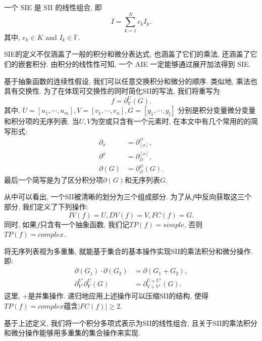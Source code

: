 \begin{definition}
一个 SIE 是 SII 的线性组合, 即
\begin{equation}
I = \sum_{k=1}^N{c_k I_k}.
\label{std_form}
\end{equation} 
其中, $c_k \in K$ and $I_k \in \mathbb F$. 
\end{definition}

SIE的定义不仅涵盖了一般的积分和微分表达式, 也涵盖了它们的乘法, 还涵盖了它们的嵌套积分. 由积分的线性性可知, 一个 AIE 一定能够通过展开加法得到 SIE.

基于抽象函数的连续性假设, 我们可以任意交换积分和微分的顺序. 类似地, 乘法也具有交换性. 为了在体现可交换性的同时简化SII的写法, 我们将重写为
\begin{equation} 
f=\partial^U_V(G). \label{st_form}
\end{equation} 
其中,  $U=[u_1,\cdots,u_m], V=[v_1,\cdots,v_n], G=[g_1,\cdots,g_l]$ 分别是积分变量\D 微分变量和积分项的无序列表. 当$U,V$为空或只含有一个元素时, 在本文中有几个常用的的简写形式:
\begin{equation}
\begin{split}
\partial_x&=\partial^\varnothing_{[x]},  \\
\partial^x&=\partial_\varnothing^{[x]},  \\ 
\partial(G)&=\partial^\varnothing_\varnothing(G).
\end{split}
\end{equation}
最后一个简写是为了区分积分项$\partial(G)$和无序列表$G$. 

从中可以看出, 一个SII被清晰的划分为三个组成部分. 为了从$f$中反向获取这三个部分, 我们定义了下列操作:
\begin{equation}
IV(f)=U,DV(f)=V,FC(f)=G.
\end{equation}
同时, 如果$f$只含有一个抽象函数, 我们记$TP(f)=simple$, 否则$TP(f)=complex$. 

将无序列表视为多重集, 就能基于集合的基本操作实现SII的乘法\D 积分和微分操作. 即:
\begin{equation}
\begin{split}
\partial(G_1)\cdot\partial(G_2)&=\partial(G_1+G_2),\\
\partial^{U'}_{V'}\partial^{U}_{V}(G)&=\partial^{U+U'}_{V+V'}(G).
\end{split}
\label{ops}
\end{equation}
这里, $+$是并集操作. 递归地应用上述操作可以压缩SII的结构, 使得$TP(f)=complex$蕴含$|FC(f)|\ge 2$. 

基于上述定义, 我们将一个积分多项式表示为SII的线性组合, 且关于SII的乘法\D 积分和微分操作能够用多重集的集合操作来实现. 

